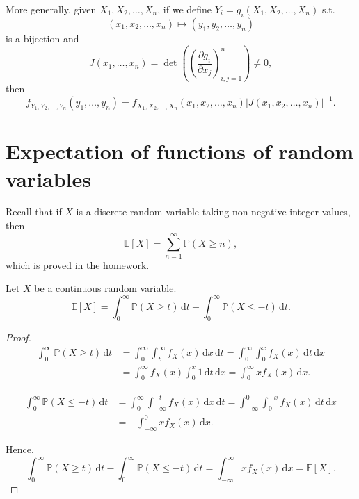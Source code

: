 More generally, given \(X_1, X_2, \dots , X_n\), if we define \(Y_i = g_i \left( X_1, X_2, \dots , X_n \right) \) s.t. 
\[
    (x_1, x_2, \dots , x_n) \mapsto (y_1, y_2, \dots , y_n)
\]  
is a bijection and 
\[
    J(x_1, \dots , x_n) = \det \left( \left( \frac{\partial g_i}{\partial x_j}  \right)_{i, j = 1}^n  \right) \neq 0, 
\]
then 
\[
    f_{Y_1, Y_2, \dots , Y_n} (y_1, \dots , y_n) = f_{X_1, X_2, \dots , X_n} \left( x_1, x_2, \dots , x_n \right) \left\vert J(x_1, x_2, \dots , x_n) \right\vert^{-1}.  
\]

\section{Expectation of functions of random variables}
Recall that if \(X\) is a discrete random variable taking non-negative integer values, then 
\[
    \mathbb{E} [X] = \sum_{n=1}^{\infty} \mathbb{P} (X \ge n), 
\] 
which is proved in the homework. 

\begin{lemma}
    Let \(X\) be a continuous random variable. 
    \[
        \mathbb{E} [X] = \int _0^{\infty} \mathbb{P} (X \ge t) \, \mathrm{d} t - \int _0^{\infty} \mathbb{P} (X \le -t) \, \mathrm{d} t. 
    \] 
\end{lemma}
\begin{proof}
    \begin{align*}
        \int _0^{\infty} \mathbb{P} (X \ge t) \, \mathrm{d} t &= \int_0^{\infty} \int _t^{\infty} f_X(x) \, \mathrm{d} x \, \mathrm{d} t = \int _0^{\infty} \int _0^x f_X(x) \, \mathrm{d} t \, \mathrm{d} x \\
        &= \int _0^{\infty} f_X(x) \int _0^x 1 \, \mathrm{d} t \, \mathrm{d} x = \int _0^{\infty} x f_X(x) \, \mathrm{d} x.         
    \end{align*}

    \begin{align*}
        \int _0^{\infty} \mathbb{P} (X \le -t) \, \mathrm{d} t &= \int _0^{\infty} \int _{-\infty }^{-t} f_X(x) \, \mathrm{d} x \, \mathrm{d} t = \int _{-\infty }^0 \int _0^{-x} f_X(x) \, \mathrm{d} t \, \mathrm{d} x \\
        &= -\int _{-\infty }^0 x f_X(x) \, \mathrm{d} x.      
    \end{align*}

    Hence,
    \[
        \int _0^{\infty} \mathbb{P} (X \ge t) \, \mathrm{d} t - \int _0^{\infty} \mathbb{P} (X \le -t) \, \mathrm{d} t = \int_{-\infty }^{\infty} x f_X(x) \, \mathrm{d} x = \mathbb{E} [X].    
    \]
\end{proof}

